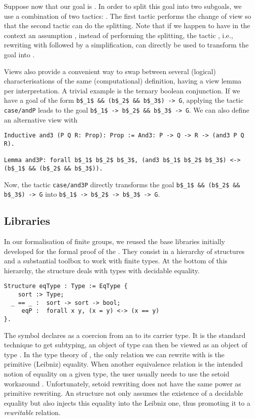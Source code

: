 Suppose now that our goal is .
In order to split this goal into two subgoals, we use a combination of
two tactics: .
The first tactic performs the change of view so that the 
second tactic can do the splitting. Note that if we happen to
have in the context an assumption ,
instead of performing the splitting, the tactic
, i.e., rewriting with  followed by  a simplification,
can directly be used to transform the goal  into .


Views also provide a convenient way to swap between 
several (logical) characterisations of the same (computational)
definition, having  a view lemma per interpretation.
A trivial example is the ternary boolean conjunction.
If we have a goal of the form \lstinline[basicstyle=\footnotesize]+b$_1$ && (b$_2$ && b$_3$) -> G+,
applying the tactic \lstinline[basicstyle=\footnotesize]+case/andP+ leads to the
goal \lstinline[basicstyle=\footnotesize]+b$_1$ -> b$_2$ && b$_3$ -> G+.
We can also define an alternative view with
\begin{lstlisting}
Inductive and3 (P Q R: Prop): Prop := And3: P -> Q -> R -> (and3 P Q R).

Lemma and3P: forall b$_1$ b$_2$ b$_3$, (and3 b$_1$ b$_2$ b$_3$) <-> (b$_1$ && (b$_2$ && b$_3$)). 
\end{lstlisting}
Now, the tactic \lstinline[basicstyle=\footnotesize]+case/and3P+  directly transforms the goal
\lstinline[basicstyle=\footnotesize]+b$_1$ && (b$_2$ && b$_3$) -> G+ into \lstinline[basicstyle=\footnotesize]+b$_1$ -> b$_2$ -> b$_3$ -> G+.


\subsection{Libraries}\label{ssec:lib}


In our formalisation of finite groups, we reused the base libraries
initially  developed for the
formal proof of the \FCT . They consist in a hierarchy of
structures and a substantial toolbox to work with finite types.
At the bottom of this hierarchy, the structure  deals with
types with decidable equality.
\begin{lstlisting}
Structure eqType : Type := EqType {
    sort :> Type; 
  _ == _ :  sort -> sort -> bool; 
     eqP :  forall x y, (x = y) <-> (x == y)
}.
\end{lstlisting}
\noindent
The \C{:>} symbol declares  as a coercion from an  to its
carrier type. It is the standard technique to get subtyping,
an object of type  can then be viewed as an object of type .
In the type theory of \Coq{}, the only relation we can rewrite with 
is the primitive (Leibniz) equality. When another
equivalence relation is the intended notion of equality on a given
type, the user usually needs to use the setoid
workaround \cite{BarCap}. Unfortunately, setoid rewriting does not have 
the same power as primitive rewriting.
An  structure not only assumes the existence of a decidable
equality \C{==} but also  injects this equality into the
Leibniz one, thus promoting it to a \emph{rewritable} relation.


